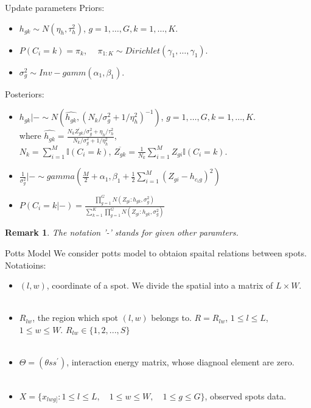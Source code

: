 \documentclass[10 pt]{beamer}
\newtheorem{remark}[theorem]{Remark}
\begin{document}
\begin{frame}{Update parameters}
Priors:
\begin{itemize}
	\item $h_{gk} \sim N(\eta_h, \tau^2_h)$, $g = 1,\dots,G, k = 1,\dots, K$.
	\item $P(C_i = k) = \pi_{k}$, $\quad \pi_{1:K} \sim Dirichlet(\gamma_1,\dots, \gamma_1)$.
	 \item $\sigma^2_g \sim Inv-gamm(\alpha_1, \beta_1)$.
\end{itemize}
Posteriors:
\begin{itemize}
	\item $h_{gk} |- \sim N(\hat{h_{gk}}, (N_k/\sigma^2_g + 1/\eta^2_h)^{-1})$,  $g = 1,\dots,G, k = 1,\dots, K$.\\
	where $\hat{h_{gk}} = \frac{N_k\overline{Z_{gk}}/\sigma^2_g + \eta_h/\tau^2_h}{N_k/\sigma^2_g + 1/\eta^2_h}$,\\
	 $N_k = \sum_{i = 1}^M \mathbb{I}(C_i = k)$,
	$\overline{Z_{gk}} = \frac{1}{N_k}\sum_{i = 1}^M Z_{gi}\mathbb{I}(C_i = k)$.
	\item $\frac{1}{\sigma^2_g}| - \sim gamma(\frac{M}{2} + \alpha_1, \beta_1 + \frac{1}{2}\sum_{i = 1}^M (Z_{gi} - h_{c_ig})^2)$
	\item $P(C_i = k|-) = \frac{\prod_{g = 1}^G N(Z_{gi}: h_{gk}, \sigma^2_g)}{\sum_{k = 1}^K \prod_{g = 1}^G N(Z_{gi}: h_{gk}, \sigma^2_g)}$
\end{itemize}
\begin{remark}
	The notation '-' stands for given other paramters.
	\end{remark}
\end{frame}

\begin{frame}{Potts Model}
We consider potts model to obtaion spaital relations between spots.\\
Notatioins:
\begin{itemize}
	\item $(l,w)$, coordinate of a spot. We divide the spatial into a matrix of $L \times W$.
	~\\
	~\\
	\item $R_{lw}$, the region which spot $(l,w)$ belongs to. $R = R_{lw}$, $1\le l \le L$, $1\le w\le W$. $R_{lw} \in \{1,2,..., S\}$
	~\\
	~\\
	\item $\Theta = (\theta{ss^{\prime}})$, interaction energy matrix, whose diagnoal element are zero.
	~\\
	~\\
	\item $X = \{x_{lwg]}: 1\le l \le L,\quad 1\le w \le W,\quad 1\le g \le G  \}$, observed spots data.
	\end{itemize}

\end{frame}
\end{document}
